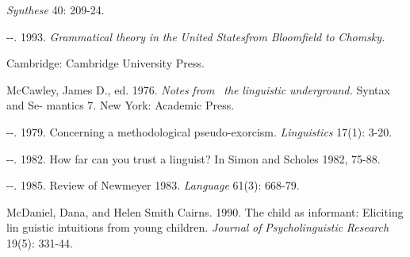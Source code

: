 \begin{styleStandard}
\textit{Synthese}\textit{ }40: 209-24.
\end{styleStandard}


\begin{listWWNumvleveli}
\item 
\begin{styleStandard}
{}-{}-. 1993. \textit{Grammatical}\textit{ }\textit{theory}\textit{ }\textit{in}\textit{ }\textit{the}\textit{ }\textit{United}\textit{ }\textit{State}\textit{s}\textit{from}\textit{ }\textit{Bloomfield}\textit{ }\textit{to}\textit{ }\textit{Chomsky.}
\end{styleStandard}


\end{listWWNumvleveli}
\begin{styleStandard}
Cambridge: Cambridge University Press.
\end{styleStandard}


\begin{styleStandard}
McCawley, James D., ed. 1976. \textit{Notes}\textit{ }\textit{from }\textit{\ }\textit{the}\textit{ }\textit{linguistic}\textit{ }\textit{underground.}\textit{ }Syntax and Se- mantics 7. New York: Academic Press.
\end{styleStandard}


\begin{listWWNumvleveli}
\item 
\begin{styleStandard}
{}-{}-. 1979. Concerning a methodological pseudo-exorcism. \textit{Linguistics}\textit{ }17(1): 3-20.
\end{styleStandard}


\item 
\begin{styleStandard}
{}-{}-. 1982. How far can you trust a linguist? In Simon and Scholes 1982, 75-88.
\end{styleStandard}


\end{listWWNumvleveli}
\begin{styleStandard}
{}-{}-. 1985. Review of Newmeyer 1983. \textit{Language}\textit{ }61(3): 668-79.
\end{styleStandard}


\begin{styleStandard}
McDaniel, Dana, and Helen Smith Cairns. 1990. The child as informant: Eliciting lin\- guistic intuitions from young children. \textit{Journal}\textit{ }\textit{of}\textit{ }\textit{Psycholinguistic}\textit{ }\textit{Research}\textit{ }19(5): 331-44.
\end{styleStandard}


